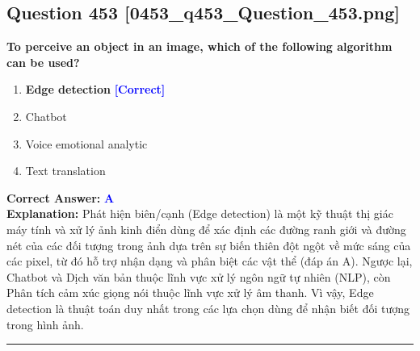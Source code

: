\documentclass[11pt,a4paper]{article}
\begin{document}
\begin{minipage}{\textwidth}
\subsection*{Question 453 \quad \footnotesize{[0453\_q453\_Question\_453.png]}}
\noindent \textbf{To perceive an object in an image, which of the following algorithm can be used?}

\begin{enumerate}[label=\Alph*.]
    \item \textbf{Edge detection} \hfill \textcolor{blue}{\textbf{[Correct]}}
    \item Chatbot
    \item Voice emotional analytic
    \item Text translation
\end{enumerate}

\noindent \textbf{Correct Answer:} \textcolor{blue}{\textbf{A}} \\[2pt]
\noindent \textbf{Explanation:} Phát hiện biên/cạnh (Edge detection) là một kỹ thuật thị giác máy tính và xử lý ảnh kinh điển dùng để xác định các đường ranh giới và đường nét của các đối tượng trong ảnh dựa trên sự biến thiên đột ngột về mức sáng của các pixel, từ đó hỗ trợ nhận dạng và phân biệt các vật thể (đáp án A). Ngược lại, Chatbot và Dịch văn bản thuộc lĩnh vực xử lý ngôn ngữ tự nhiên (NLP), còn Phân tích cảm xúc giọng nói thuộc lĩnh vực xử lý âm thanh. Vì vậy, Edge detection là thuật toán duy nhất trong các lựa chọn dùng để nhận biết đối tượng trong hình ảnh.

\par\vspace{0.3cm}
\hrule
\vspace{0.3cm}
\end{minipage}
\end{document}
